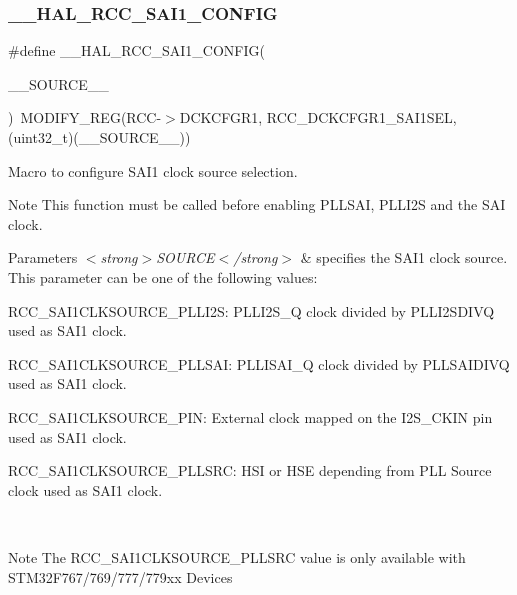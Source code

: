 \subsubsection{\texorpdfstring{\_\_HAL\_RCC\_SAI1\_CONFIG}{\_\_HAL\_RCC\_SAI1\_CONFIG}}
{\footnotesize\ttfamily \#define \+\_\+\+\_\+\+H\+A\+L\+\_\+\+R\+C\+C\+\_\+\+S\+A\+I1\+\_\+\+C\+O\+N\+F\+IG(\begin{DoxyParamCaption}\item[{}]{\+\_\+\+\_\+\+S\+O\+U\+R\+C\+E\+\_\+\+\_\+ }\end{DoxyParamCaption})~M\+O\+D\+I\+F\+Y\+\_\+\+R\+EG(R\+CC-\/$>$D\+C\+K\+C\+F\+G\+R1, R\+C\+C\+\_\+\+D\+C\+K\+C\+F\+G\+R1\+\_\+\+S\+A\+I1\+S\+EL, (uint32\+\_\+t)(\+\_\+\+\_\+\+S\+O\+U\+R\+C\+E\+\_\+\+\_\+))}



Macro to configure S\+A\+I1 clock source selection. 

\begin{DoxyNote}{Note}
This function must be called before enabling P\+L\+L\+S\+AI, P\+L\+L\+I2S and the S\+AI clock. 
\end{DoxyNote}

\begin{DoxyParams}{Parameters}
{\em $<$strong$>$\+S\+O\+U\+R\+C\+E$<$/strong$>$} & specifies the S\+A\+I1 clock source. This parameter can be one of the following values\+: \begin{DoxyItemize}
\item R\+C\+C\+\_\+\+S\+A\+I1\+C\+L\+K\+S\+O\+U\+R\+C\+E\+\_\+\+P\+L\+L\+I2S\+: P\+L\+L\+I2\+S\+\_\+Q clock divided by P\+L\+L\+I2\+S\+D\+I\+VQ used as S\+A\+I1 clock. \item R\+C\+C\+\_\+\+S\+A\+I1\+C\+L\+K\+S\+O\+U\+R\+C\+E\+\_\+\+P\+L\+L\+S\+AI\+: P\+L\+L\+I\+S\+A\+I\+\_\+Q clock divided by P\+L\+L\+S\+A\+I\+D\+I\+VQ used as S\+A\+I1 clock. \item R\+C\+C\+\_\+\+S\+A\+I1\+C\+L\+K\+S\+O\+U\+R\+C\+E\+\_\+\+P\+IN\+: External clock mapped on the I2\+S\+\_\+\+C\+K\+IN pin used as S\+A\+I1 clock. \item R\+C\+C\+\_\+\+S\+A\+I1\+C\+L\+K\+S\+O\+U\+R\+C\+E\+\_\+\+P\+L\+L\+S\+RC\+: H\+SI or H\+SE depending from P\+LL Source clock used as S\+A\+I1 clock. \end{DoxyItemize}
\\
\hline
\end{DoxyParams}
\begin{DoxyNote}{Note}
The R\+C\+C\+\_\+\+S\+A\+I1\+C\+L\+K\+S\+O\+U\+R\+C\+E\+\_\+\+P\+L\+L\+S\+RC value is only available with S\+T\+M32\+F767/769/777/779xx Devices 
\end{DoxyNote}
\mbox{\label{group___r_c_c_ex___exported___macros_ga18ab74d31998863f042a39d50f27c163}} 
